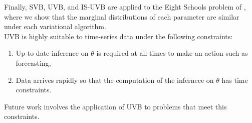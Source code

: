\documentclass[12pt,a4paper]{article}\usepackage[]{graphicx}\usepackage[]{color}
\begin{document}
Finally, SVB, UVB, and IS-UVB are applied to the Eight Schools problem of \citet{Gelman2014}, where we show that the marginal distributions of each parameter are similar under each variational algorithm.
\\

UVB is highly suitable to time-series data under the following constraints:
\begin{enumerate}
\item Up to date inference on $\theta$ is required at all times to make an action such as forecasting,
\item Data arrives rapidly so that the computation of the infernece on $\theta$ has time constraints.
\end{enumerate}
Future work involves the application of UVB to problems that meet this constraints.



\end{document}
